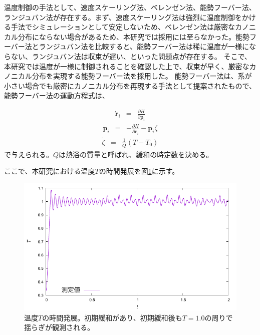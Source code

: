 \documentclass[titlepage]{jsreport}
\begin{document}
温度制御の手法として、速度スケーリング法\cite{velocity-scaling}、ベレンゼン法\cite{berendsen}、能勢フーバー法\cite{nose,hoover}、ランジュバン法\cite{langevin}が存在する。まず、速度スケーリング法は強烈に温度制御をかける手法でシミュレーションとして安定しないため、ベレンゼン法は厳密なカノニカル分布にならない場合があるため、本研究では採用には至らなかった。能勢フーバー法とランジュバン法を比較すると、能勢フーバー法は稀に温度が一様にならない、ランジュバン法は収束が遅い、といった問題点が存在する。
そこで、本研究では温度が一様に制御されることを確認した上で、収束が早く、厳密なカノニカル分布を実現する能勢フーバー法を採用した。
能勢フーバー法は、系が小さい場合でも厳密にカノニカル分布を再現する手法として提案されたもので、能勢フーバー法の運動方程式は、

\large
\begin{eqnarray}
\dot{\mathbf{r}}_i &=& \frac{\partial H}{\partial \mathbf{p}_i} \label{eq:nose-hoover-r}
\end{eqnarray}
\normalsize
\large
\begin{eqnarray}
\dot{\mathbf{p}}_i &=& -\frac{\partial H}{\partial \mathbf{r}_i}-\mathbf{p}_i\zeta \label{eq:nose-hoover-p}
\end{eqnarray}
\normalsize
\large
\begin{eqnarray}
\dot{\zeta} &=& \frac{1}{Q}(T-T_0) \label{eq:nose-hoover-zeta}
\end{eqnarray}
\normalsize
で与えられる。$Q$は熱浴の質量と呼ばれ、緩和の時定数を決める。

ここで、本研究における温度$T$の時間発展を図\ref{fig:time-temperature}に示す。

\begin{figure}[htbp]
    \begin{center}
        \includegraphics[width=14cm]{fig/nose-hoover/tT.pdf}
    \end{center}
    \caption{温度$T$の時間発展。初期緩和があり、初期緩和後も$T=1.0$の周りで揺らぎが観測される。}
    \label{fig:time-temperature}
\end{figure}
\end{document}
